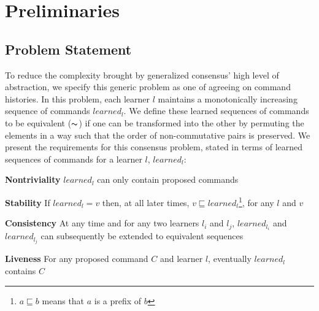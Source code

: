 \section{Preliminaries}



\subsection{Problem Statement}
To reduce the complexity brought by generalized consensus' high level of abstraction, we specify this generic problem as one of agreeing on command histories. In this problem, each learner $l$ maintains a monotonically increasing sequence of commands $learned_l$. We define these learned sequences of commands to be equivalent ($\thicksim$) if one can be transformed into the other by permuting the elements in a way such that the order of non-commutative pairs is preserved. We present the requirements for this consensus problem, stated in terms of learned sequences of commands for a learner $l$, $learned_l$:\par
\textbf{Nontriviality} $learned_l$ can only contain proposed commands \par
\textbf{Stability} If $learned_l = v$ then, at all later times, $v \sqsubseteq learned_l$\footnote{$a \sqsubseteq b$ means that $a$ is a prefix of $b$}, for any $l$ and $v$ \par
\textbf{Consistency} At any time and for any two learners $l_i$ and $l_j$, $learned_{l_i}$ and $learned_{l_j}$ can subsequently be extended to equivalent sequences\par
\textbf{Liveness} For any proposed command $C$ and learner $l$, eventually $learned_l$ contains $C$ \par

